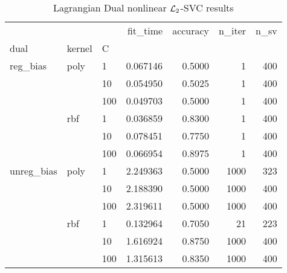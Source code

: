 \begin{table}[H]
\centering
\caption{Lagrangian Dual nonlinear $\protect \mathcal{L}_2$-SVC results}
\label{nonlinear_lagrangian_dual_l2_svc_cv_results}
\begin{tabular}{lllrrrr}
\toprule
           &     &     &  fit\_time &  accuracy &  n\_iter &  n\_sv \\
dual & kernel & C &           &           &         &       \\
\midrule
reg\_bias & poly & 1   &  0.067146 &    0.5000 &       1 &   400 \\
           &     & 10  &  0.054950 &    0.5025 &       1 &   400 \\
           &     & 100 &  0.049703 &    0.5000 &       1 &   400 \\
           & rbf & 1   &  0.036859 &    0.8300 &       1 &   400 \\
           &     & 10  &  0.078451 &    0.7750 &       1 &   400 \\
           &     & 100 &  0.066954 &    0.8975 &       1 &   400 \\
unreg\_bias & poly & 1   &  2.249363 &    0.5000 &    1000 &   323 \\
           &     & 10  &  2.188390 &    0.5000 &    1000 &   400 \\
           &     & 100 &  2.319611 &    0.5000 &    1000 &   400 \\
           & rbf & 1   &  0.132964 &    0.7050 &      21 &   223 \\
           &     & 10  &  1.616924 &    0.8750 &    1000 &   400 \\
           &     & 100 &  1.315613 &    0.8350 &    1000 &   400 \\
\bottomrule
\end{tabular}
\end{table}
